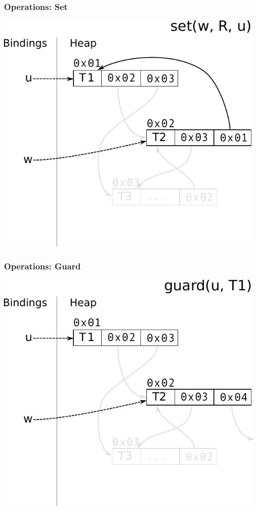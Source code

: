 \documentclass[utf8x]{beamer}
\begin{document}
\begin{frame}[plain]
  \frametitle{Operations: Set}
  \includegraphics[scale=0.8]{figures/set02}
\end{frame}

\begin{frame}[plain]
  \frametitle{Operations: Guard}
  \includegraphics[scale=0.8]{figures/guard01}
\end{frame}
\end{document}
